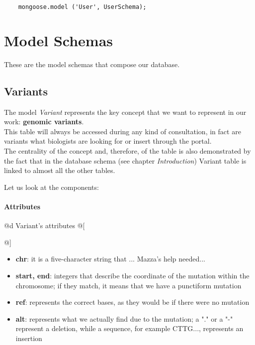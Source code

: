 \begin{lstlisting}
	mongoose.model ('User', UserSchema);
\end{lstlisting}


\section{Model Schemas}
These are the model schemas that compose our database.


\subsection{Variants}
The model \emph{Variant} represents the key concept that we want to represent in our work: \textbf{genomic variants}.
\\This table will always be accessed during any kind of consultation, in fact are variants what biologists are looking for or insert through the portal.
\\The centrality of the concept and, therefore, of the table is also demonstrated by the fact that in the database schema (see chapter \emph{Introduction}) Variant table is linked to almost all the other tables.
 
\newpage

Let us look at the components:

\paragraph{Attributes}      

	@d {Variant's attributes} @[
		
	@]

\begin{itemize}
	\item \textbf{chr}: it is a five-character string that ... {Mazza's help needed...}
 	\item \textbf{start, end}:  integers that describe the coordinate of the mutation within the chromosome; if they match, it means that we have a punctiform mutation
	\item \textbf{ref}: represents the correct bases, as they would be if there were no mutation
   	\item \textbf{alt}: represents what we actually find due to the mutation; a "." or a "-" represent a deletion, while a sequence, for example CTTG..., represents an insertion
\end{itemize}

